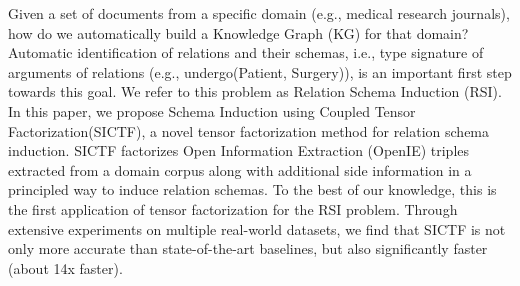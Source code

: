 Given a set of documents from a specific domain (e.g., medical research journals), how do we automatically build a Knowledge Graph (KG) for that domain? Automatic identification of relations and their schemas, i.e., type signature of arguments of relations (e.g., undergo(Patient, Surgery)), is an important first step towards this goal. We refer to this problem as Relation Schema Induction (RSI). In this paper, we propose Schema Induction using Coupled Tensor Factorization(SICTF), a novel tensor factorization method for relation schema induction. SICTF factorizes Open Information Extraction (OpenIE) triples extracted from a domain corpus along with additional side information in a principled way to induce relation schemas. To the best of our knowledge, this is the first application of tensor factorization for the RSI problem. Through extensive experiments on multiple real-world datasets, we find that SICTF is not only more accurate than state-of-the-art baselines, but also significantly faster (about 14x faster).
